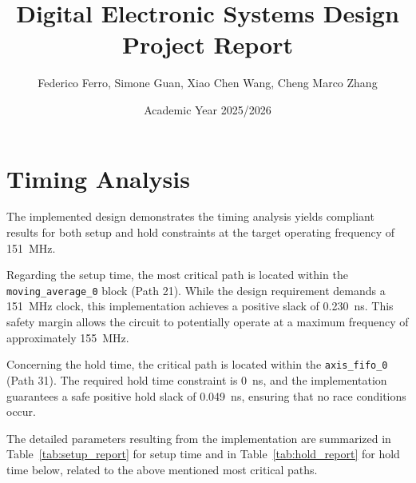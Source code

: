 \documentclass[11pt]{article}
\title{Digital Electronic Systems Design Project Report}
\author{Federico Ferro, Simone Guan, Xiao Chen Wang, Cheng Marco Zhang}
\date{Academic Year 2025/2026}
\begin{document}
\maketitle


\section*{Timing Analysis}

The implemented design demonstrates the timing analysis yields compliant results for both setup and hold constraints at the target operating frequency of 151~MHz.

Regarding the setup time, the most critical path is located within the \texttt{moving\_average\_0} block (Path 21). While the design requirement demands a 151~MHz clock, this implementation achieves a positive slack of 0.230~ns. This safety margin allows the circuit to potentially operate at a maximum frequency of approximately 155~MHz.

Concerning the hold time, the critical path is located within the \texttt{axis\_fifo\_0} (Path 31). The required hold time constraint is 0~ns, and the implementation guarantees a safe positive hold slack of 0.049~ns, ensuring that no race conditions occur.

The detailed parameters resulting from the implementation are summarized in Table~\ref{tab:setup_report} for setup time and in Table~\ref{tab:hold_report} for hold time below, related to the above mentioned most critical paths.
\end{document}
